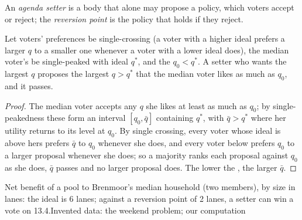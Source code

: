 \begin{definition}\label{def:b3:public-choice-voting:agenda-setter}
An \emph{agenda setter} is a body that alone may propose a policy, which voters
accept or reject; the \emph{reversion point} is the policy that holds if they
reject.
\end{definition}

\begin{proposition}\label{prop:b3:public-choice-voting:setter}
Let voters' preferences be single-crossing (a voter with a higher ideal prefers a
larger $q$ to a smaller one whenever a voter with a lower ideal does), the median
voter's be single-peaked with ideal $q^*$, and the  $q_0 < q^*$. A setter who wants the largest $q$ proposes the largest $q > q^*$ that the median
voter likes as much as $q_0$, and it passes.
\end{proposition}

\begin{proof}
The median voter accepts any $q$ she likes at least as much as $q_0$; by single-peakedness
these form an interval $[q_0, \bar q]$ containing $q^*$, with $\bar q > q^*$ where her utility returns to its
level at $q_0$. By single crossing, every voter whose ideal is above hers prefers $\bar q$ to
$q_0$ whenever she does, and every voter below prefers $q_0$ to a larger proposal whenever she
does; so a majority ranks each proposal against $q_0$ as she does, $\bar q$ passes and no larger
proposal does.
The lower the , the larger $\bar q$.
\end{proof}

\begin{omchart}{Net benefit of a pool to Brenmoor's median household (two members),
by size in lanes: the ideal is 6 lanes; against a reversion point of 2 lanes, a
setter can win a vote on 13.4.}{Invented data: the weekend problem; our computation}
\end{omchart}


